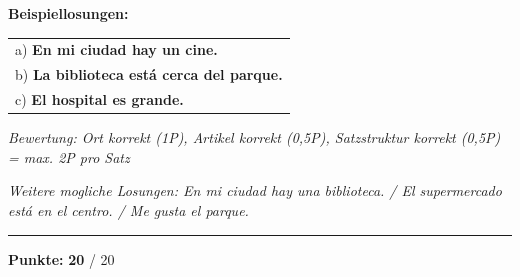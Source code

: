 \documentclass[11pt, a4paper]{article}
\newcommand{\maxpunkte}{20}
\newcommand{\loesung}[1]{\textcolor{loesung}{\textbf{#1}}}
\begin{document}
\vspace{0.5em}

\textbf{Beispiellosungen:}

\noindent
\renewcommand{\arraystretch}{2.0}
\begin{tabular}{p{\textwidth}}
a) \loesung{En mi ciudad hay un cine.} \\
b) \loesung{La biblioteca está cerca del parque.} \\
c) \loesung{El hospital es grande.} \\
\end{tabular}

\vspace{0.5em}
\textit{\textcolor{grau}{Bewertung: Ort korrekt (1P), Artikel korrekt (0,5P), Satzstruktur korrekt (0,5P) = max. 2P pro Satz}}

\vspace{0.5em}
\textit{\textcolor{grau}{Weitere mogliche Losungen: En mi ciudad hay una biblioteca. / El supermercado está en el centro. / Me gusta el parque.}}


\vspace{20pt}
\hrule
\vspace{10pt}

\begin{flushright}
\textbf{Punkte:} \loesung{\maxpunkte} / \maxpunkte
\end{flushright}
\end{document}
